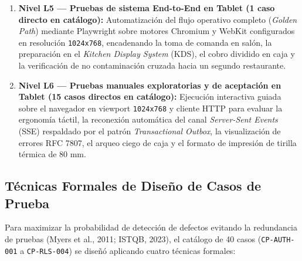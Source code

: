 \documentclass[stu,12pt,a4paper]{apa7}
\begin{document}
\begin{enumerate}
\item
  \textbf{Nivel L5 --- Pruebas de sistema End-to-End en Tablet (1 caso directo en catálogo):} Automatización del flujo operativo completo (\emph{Golden Path}) mediante Playwright sobre motores Chromium y WebKit configurados en resolución \texttt{1024x768}, encadenando la toma de comanda en salón, la preparación en el \emph{Kitchen Display System} (KDS), el cobro dividido en caja y la verificación de no contaminación cruzada hacia un segundo restaurante.
\item
  \textbf{Nivel L6 --- Pruebas manuales exploratorias y de aceptación en Tablet (15 casos directos en catálogo):} Ejecución interactiva guiada sobre el navegador en viewport \texttt{1024x768} y cliente HTTP para evaluar la ergonomía táctil, la reconexión automática del canal \emph{Server-Sent Events} (SSE) respaldado por el patrón \emph{Transactional Outbox}, la visualización de errores RFC 7807, el arqueo ciego de caja y el formato de impresión de tirilla térmica de 80 mm.
\end{enumerate}

\subsection{Técnicas Formales de Diseño de Casos de Prueba}\label{tuxe9cnicas-formales-de-diseuxf1o-de-casos-de-prueba}

Para maximizar la probabilidad de detección de defectos evitando la redundancia de pruebas (Myers et al., 2011; ISTQB, 2023), el catálogo de 40 casos (\texttt{CP-{}\allowbreak{}AUTH-{}\allowbreak{}001} a \texttt{CP-{}\allowbreak{}RLS-{}\allowbreak{}004}) se diseñó aplicando cuatro técnicas formales:
\end{document}
